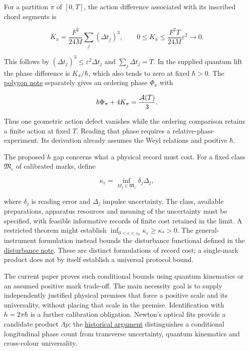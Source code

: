 \documentclass[11pt,a4paper]{article}
\begin{document}
For a partition \(\pi\) of \([0,T]\), the action difference associated
with its inscribed chord segments is

\[K_\pi=\frac{F^2}{24M}\sum_j(\Delta t_j)^3,
\qquad 0\le K_\pi\le\frac{F^2T}{24M}\varepsilon^2\to0.\]

This follows by \((\Delta t_j)^3\le\varepsilon^2\Delta t_j\) and
\(\sum_j\Delta t_j=T\). In the supplied quantum lift the phase
difference is \(K_\pi/\hbar\), which also tends to zero at fixed
\(\hbar>0\). The
\href{cut-measure-newton.md\#weyl-lifting-and-polygon-phases}{polygon
note} separately gives an ordering phase \(\Phi_\pi\) with

\[\hbar\Phi_\pi+4K_\pi=\frac{{\cal A}(T)}3.\]

Thus one geometric action defect vanishes while the ordering comparison
retains a finite action at fixed \(T\). Reading that phase requires a
relative-phase experiment. Its derivation already assumes the Weyl
relations and positive \(\hbar\).

The proposed \(h\) gap concerns what a physical record must cost. For a
fixed class \(\mathfrak M_\varepsilon\) of calibrated marks, define

\[\kappa_\varepsilon
=\inf_{M_j\in\mathfrak M_\varepsilon}\delta_j\Delta_j,\]

where \(\delta_j\) is reading error and \(\Delta_j\) impulse
uncertainty. The class, available preparations, apparatus resources and
meaning of the uncertainty must be specified, with feasible informative
records of finite cost retained in the limit. A restricted theorem might
establish
\(\inf_{0<\varepsilon<\varepsilon_0}\kappa_\varepsilon\ge\kappa_*>0\).
The general-instrument formulation instead bounds the disturbance
functional defined in the
\href{record-distance-path-length.md\#general-disturbance-theorem-with-an-unknown-preparation}{disturbance
note}. These are distinct formulations of record cost; a single-mark
product does not by itself establish a universal protocol bound.

The current paper proves such conditional bounds using quantum
kinematics or an assumed positive mark trade-off. The main necessity
goal is to supply independently justified physical premises that force a
positive scale and its universality, without placing that scale in the
premise. Identification with \(h=2\pi\hbar\) is a further calibration
obligation. Newton's optical fits provide a candidate product
\(\Lambda p\); the \href{planck-gap-paper.md}{historical argument}
distinguishes a conditional longitudinal phase count from transverse
uncertainty, quantum kinematics and cross-colour universality.
\end{document}
